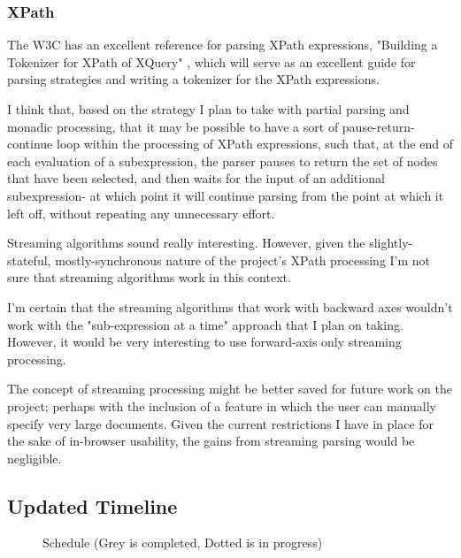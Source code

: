 \documentclass{acm_proc_article-sp}
\begin{document}
\subsubsection{XPath}
The W3C has an excellent reference for parsing XPath expressions, "Building a Tokenizer for XPath of XQuery" \cite{xpathtokenizer}, which will serve as an excellent guide for parsing strategies and writing a tokenizer for the XPath expressions.

I think that, based on the strategy I plan to take with partial parsing and monadic processing, that it may be possible to have a sort of pause-return-continue loop within the processing of XPath expressions, such that, at the end of each evaluation of a subexpression, the parser pauses to return the set of nodes that have been selected, and then waits for the input of an additional subexpression- at which point it will continue parsing from the point at which it left off, without repeating any unnecessary effort. 

Streaming algorithms \cite{barton:streaming} sound really interesting.  However, given the slightly-stateful, mostly-synchronous nature of the project's XPath processing I'm not sure that streaming algorithms work in this context.  

I'm certain that the streaming algorithms that work with backward axes wouldn't work with the "sub-expression at a time" approach that I plan on taking.  However, it would be very interesting to use forward-axis only streaming processing. 

The concept of streaming processing might be better saved for future work on the project; perhaps with the inclusion of a feature in which the user can manually specify very large documents.  Given the current restrictions I have in place for the sake of in-browser usability, the gains from streaming parsing would be negligible.




\subsection{Updated Timeline}
\begin{figure}[!htpb]
\centering
{}
\caption{Schedule (Grey is completed, Dotted is in progress)}
\end{figure}

\newpage
\nocite{gottlob:complexity}
\nocite{marx:semantic}
\nocite{xmlspec}


\end{document}
